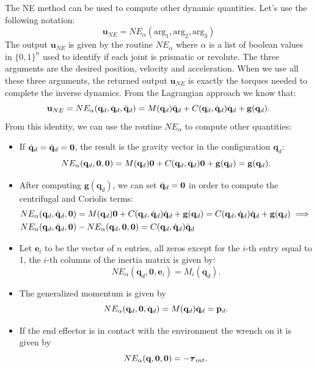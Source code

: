 \documentclass[10pt, a4paper]{report}
\newcommand{\q}{{\mathbf q}}
\begin{document}
The NE method can be used to compute other dynamic quantities. Let's use the following notation:\begin{equation}
    \mathbf u_{NE}=NE_\alpha(\text{arg}_1,\text{arg}_2,\text{arg}_3)
\end{equation}
The output $\mathbf u_{NE}$ is given by the routine $NE_\alpha$ where $\alpha$ is a list of boolean values in $\{0,1\}^n$ used to identify if each joint is prismatic or revolute. The three arguments are the desired position, velocity and acceleration. When we use all these three arguments, the returned output $\mathbf u_{NE}$ is exactly the torques needed to complete the inverse dynamics. From the Lagrangian approach we know that:\begin{equation}
    \mathbf u_{NE}=NE_\alpha(\q_d,\dq_d,\ddq_d)=M(\q_d)\ddq_d+C(\q_d,\dq_d)\dq_d+\mathbf g(\q_d).
\end{equation} 
From this identity, we can use the routine $NE_\alpha$ to compute other quantities:\begin{itemize}
    \item If ${\dot{\mathbf q}}_d={\ddot{\mathbf q}}_d=\mathbf 0$, the result is the gravity vector in the configuration $\q_d$:\begin{equation}
        NE_\alpha(\q_d,\mathbf 0,\mathbf 0)=M(\q_d)\mathbf 0+C(\q_d,\dq_d)\mathbf 0+\mathbf g(\q_d)=\mathbf g(\q_d).
    \end{equation}
    \item After computing $\mathbf g(\q_d)$, we can set ${\ddot{\mathbf q}}_d=\mathbf 0$ in order to compute the centrifugal and Coriolis terms:\begin{align}
         &NE_\alpha(\q_d,\dq_d,\mathbf 0)=M(\q_d)\mathbf 0+C(\q_d,\dq_d)\dq_d+\mathbf g(\q_d)=C(\q_d,\dq_d)\dq_d+\mathbf g(\q_d)\implies\\
         &NE_\alpha(\q_d,\dq_d,\mathbf 0)-NE_\alpha(\q_d,\mathbf 0,\mathbf 0)=C(\q_d,\dq_d)\dq_d
    \end{align}
    \item Let $\mathbf e_i$
 to be the vector of $n$ entries, all zeros except for the $i$-th entry equal to 1, the $i$-th columns of the inertia matrix is given by:\begin{equation}
    NE_\alpha(\q_d,\mathbf 0,\mathbf e_i)=M_i(\q_d).
 \end{equation} 
 \item The generalized momentum is given by\begin{equation}
    NE_\alpha(\q_d,\mathbf 0,\dq_d)=M(\q_d)\dq_d=\mathbf p_d
    .
 \end{equation}
 \item If the end effector is in contact with the environment the wrench on it is given by\begin{equation}
    NE_\alpha(\q,\mathbf 0,\mathbf 0)=-\btau_{int}
    .
 \end{equation}
\end{itemize}
\end{document}
